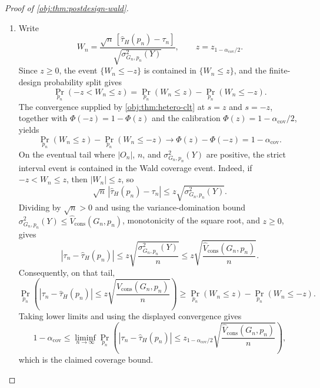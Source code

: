 \begin{proof}[Proof of \cref{obj:thm:postdesign-wald}]
\begin{enumerate}
\item Write
\[
W_n=
\frac{\sqrt n\,[\widehat\tau_H(p_n)-\tau_n]}
{\sqrt{\sigma^2_{G_n,p_n}(Y)}},
\qquad
z=z_{1-\alpha_{\mathrm{cov}}/2}.
\]
Since \(z\ge0\), the event \(\{W_n\le -z\}\) is contained in \(\{W_n\le z\}\), and the finite-design probability split gives
\[
\Pr_{p_n}\!\left(-z<W_n\le z\right)
=\Pr_{p_n}\!\left(W_n\le z\right)-\Pr_{p_n}\!\left(W_n\le -z\right).
\]
The convergence supplied by \cref{obj:thm:hetero-clt} at \(s=z\) and \(s=-z\), together with
\(\Phi(-z)=1-\Phi(z)\) and the calibration \(\Phi(z)=1-\alpha_{\mathrm{cov}}/2\), yields
\[
\Pr_{p_n}\!\left(W_n\le z\right)-\Pr_{p_n}\!\left(W_n\le -z\right)
\longrightarrow
\Phi(z)-\Phi(-z)
=1-\alpha_{\mathrm{cov}} .
\]
On the eventual tail where \(|O_n|\), \(n\), and \(\sigma^2_{G_n,p_n}(Y)\) are positive, the strict interval event is contained in the Wald coverage event.  Indeed, if
\(-z<W_n\le z\), then \(|W_n|\le z\), so
\[
\sqrt n\,|\widehat\tau_H(p_n)-\tau_n|
\le z\sqrt{\sigma^2_{G_n,p_n}(Y)}.
\]
Dividing by \(\sqrt n>0\) and using the variance-domination bound
\(\sigma^2_{G_n,p_n}(Y)\le \widehat V_{\mathrm{cons}}(G_n,p_n)\), monotonicity of the square root, and \(z\ge0\), gives
\[
\left|\tau_n-\widehat\tau_H(p_n)\right|
\le
z
\sqrt{\frac{\sigma^2_{G_n,p_n}(Y)}{n}}
\le
z
\sqrt{\frac{\widehat V_{\mathrm{cons}}(G_n,p_n)}{n}}.
\]
Consequently, on that tail,
\[
\Pr_{p_n}\!\left(
\left|\tau_n-\widehat\tau_H(p_n)\right|
\le
z\sqrt{\frac{\widehat V_{\mathrm{cons}}(G_n,p_n)}{n}}
\right)
\ge
\Pr_{p_n}\!\left(W_n\le z\right)-\Pr_{p_n}\!\left(W_n\le -z\right).
\]
Taking lower limits and using the displayed convergence gives
\[
1-\alpha_{\mathrm{cov}}
\le
\liminf_{n\to\infty}
\Pr_{p_n}\!\left(
\left|\tau_n-\widehat\tau_H(p_n)\right|
\le
z_{1-\alpha_{\mathrm{cov}}/2}
\sqrt{\frac{\widehat V_{\mathrm{cons}}(G_n,p_n)}{n}}
\right),
\]
which is the claimed coverage bound.
\end{enumerate}
\end{proof}

